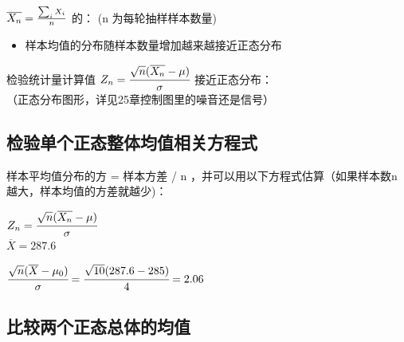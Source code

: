 \(\overline{X_n} = {\sum_i X_i \over n}\) 的： (n 为每轮抽样样本数量)

\begin{description}
\item[]
\end{description}

\begin{itemize}
\tightlist
\item
  样本均值的分布随样本数量增加越来越接近正态分布
\end{itemize}

检验统计量计算值
\(Z_n = \cfrac{ \sqrt{n}(\overline{X_n} - \mu) }{\sigma}\)
接近正态分布：\\


（正态分布图形，详见25章控制图里的噪音还是信号）\\

\hypertarget{ux68c0ux9a8cux5355ux4e2aux6b63ux6001ux6574ux4f53ux5747ux503cux76f8ux5173ux65b9ux7a0bux5f0f}{%
\subsection{检验单个正态整体均值相关方程式}\label{ux68c0ux9a8cux5355ux4e2aux6b63ux6001ux6574ux4f53ux5747ux503cux76f8ux5173ux65b9ux7a0bux5f0f}}

样本平均值分布的方 = 样本方差 / n ，并可以用以下方程式估算（如果样本数n
越大，样本均值的方差就越少)：

\(Z_n = \cfrac{ \sqrt{n}(\overline{X_n} - \mu) }{\sigma}\)\\

\(\overline{X} = 287.6\)

\(\cfrac{ \sqrt{n}(\overline{X} - \mu_0) }{\sigma} = \cfrac{ \sqrt{10}( 287.6 - 285 ) }{4} = 2.06\)\\

\hypertarget{ux6bd4ux8f83ux4e24ux4e2aux6b63ux6001ux603bux4f53ux7684ux5747ux503c-1}{%
\subsection{比较两个正态总体的均值}\label{ux6bd4ux8f83ux4e24ux4e2aux6b63ux6001ux603bux4f53ux7684ux5747ux503c-1}}


